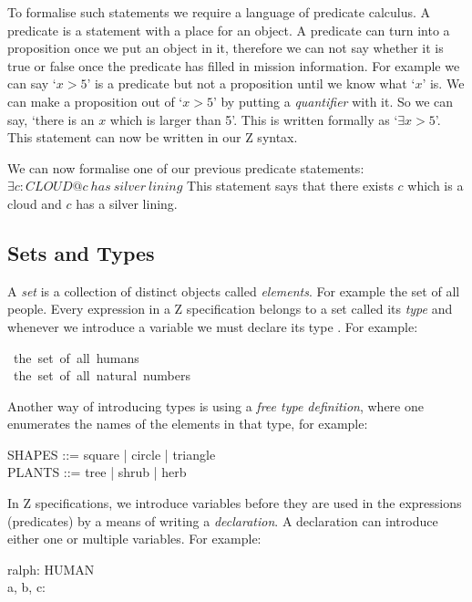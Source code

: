 To formalise such statements we require a language of predicate calculus. A
predicate is a statement with a place for an object. A predicate can turn into a
proposition once we put an object in it, therefore we can not say whether it is
true or false once the predicate has filled in mission information. For example
we can say `$x > 5$' is a predicate but not a proposition until we know what
`$x$' is. We can make a proposition out of `$x > 5$' by putting a
\textit{quantifier} with it. So we can say, `there is an $x$ which is larger
than 5'. This is written formally as `$\exists x > 5$'. This statement can now
be written in our Z syntax.

We can now formalise one of our previous predicate statements:
\newline
$\exists c: CLOUD @ c\ has\ silver\ lining$ This statement says that there
exists $c$ which is a cloud and $c$ has a silver lining.

\subsection{Sets and Types}

A \textit{set} is a collection of distinct objects called \textit{elements}. For
example the set of all people. Every expression in a Z specification belongs to
a set called its \textit{type} and whenever we introduce a variable we must
declare its type \cite{essenceofz}. For example:

\begin{zed}
[HUMAN]\ the\ set\ of\ all\ humans \\
\nat\ the\ set\ of\ all\ natural\ numbers
\end{zed}

Another way of introducing types is using a \textit{free type definition}, where
one enumerates the names of the elements in that type, for example:

\begin{zed}
SHAPES ::= square | circle | triangle \\
PLANTS ::= tree | shrub | herb \\
\end{zed}

In Z specifications, we introduce variables before they are used in the
expressions (predicates) by a means of writing a \textit{declaration}. A
declaration can introduce either one or multiple variables. For example:

\begin{zed}
ralph: HUMAN \\
a, b, c: \nat
\end{zed}

